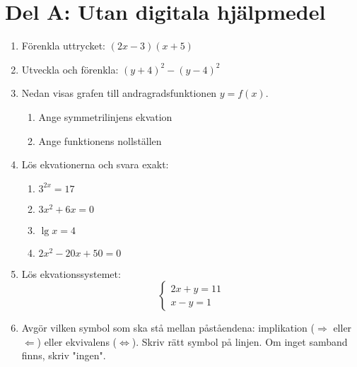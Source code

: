 \documentclass[a4paper,11pt]{article}
\begin{document}
\section*{Del A: Utan digitala hjälpmedel}
\begin{enumerate}[label=\arabic*.]
    \item Förenkla uttrycket: $(2x - 3)(x + 5)$
    \item Utveckla och förenkla: $(y + 4)^2 - (y - 4)^2$
    \item Nedan visas grafen till andragradsfunktionen $y = f(x)$. 
    \begin{enumerate}[label=\alph*)]
      \item Ange symmetrilinjens ekvation
      \item Ange funktionens nollställen
    \end{enumerate}
    \begin{center}
    \end{center}
    \item Lös ekvationerna och svara exakt:
    \begin{enumerate}[label=\alph*)]
        \item $3^{2x} = 17$
        \item $3x^2 + 6x = 0$
        \item $\lg x = 4$
        \item $2x^2 - 20x + 50 = 0$
    \end{enumerate}
    \item Lös ekvationssystemet:
    \[
    \left\{
    \begin{array}{l}
      2x + y = 11 \\
      x - y = 1
    \end{array}
    \right.
    \]
    \item Avgör vilken symbol som ska stå mellan påståendena: implikation ($\Rightarrow$ eller $\Leftarrow$) eller ekvivalens ($\Leftrightarrow$). Skriv rätt symbol på linjen. Om inget samband finns, skriv "ingen".
    

\end{enumerate}
\end{document}
